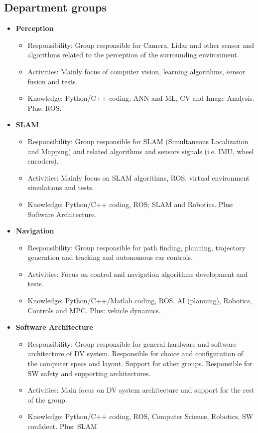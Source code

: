\documentclass[graybox]{svmult}
\begin{document}
\subsection{Department groups}
\begin{itemize}
	\item \textbf{Perception}
	\begin{itemize}
		\item Responsibility: Group responsible for Camera, Lidar and other sensor and algorithms related to the perception of the surrounding environment.
		\item Activities: Mainly focus of computer vision, learning algorithms, sensor fusion and tests.
		\item Knowledge: Python/C++ coding, ANN and ML, CV and Image Analysis. Plus: ROS.
	\end{itemize}
    
	\item \textbf{SLAM}
	\begin{itemize}
		\item Responsibility: Group responsible for SLAM (Simultaneous Localization and Mapping) and related algorithms and sensors signals (i.e. IMU, wheel encoders).
        \item Activities: Mainly focus on SLAM algorithms, ROS, virtual environment simulations and tests.
		\item Knowledge: Python/C++ coding, ROS; SLAM and Robotics. Plus: Software Architecture.
	\end{itemize}

	\item \textbf{Navigation}
	\begin{itemize}
		\item Responsibility: Group responsible for path finding, planning, trajectory generation and tracking and autonomous car controls.
		 \item Activities: Focus on control and navigation algorithms development and tests. 
		\item Knowledge: Python/C++/Matlab coding, ROS, AI (planning), Robotics, Controls and MPC. Plus: vehicle dynamics.
	\end{itemize}

	\item \textbf{Software Architecture}
    \begin{itemize}
		\item Responsibility: Group responsible for general hardware and software architecture of DV system. Responsible for choice and configuration of the computer specs and layout. Support for other groups. Responsible for SW safety and supporting architectures.
		\item Activities: Main focus on DV system architecture and support for the rest of the group.
		\item Knowledge: Python/C++ coding, ROS, Computer Science, Robotics, SW confident. Plus: SLAM
	\end{itemize}


\end{itemize}
\end{document}
